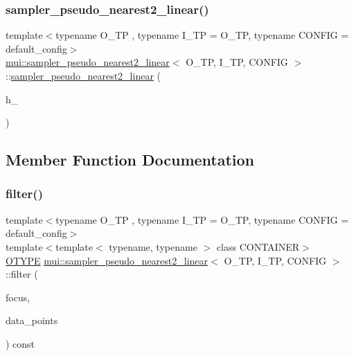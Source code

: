 \subsubsection{\texorpdfstring{sampler\+\_\+pseudo\+\_\+nearest2\+\_\+linear()}{sampler\_pseudo\_nearest2\_linear()}}
{\footnotesize\ttfamily template$<$typename O\+\_\+\+TP , typename I\+\_\+\+TP  = O\+\_\+\+TP, typename C\+O\+N\+F\+IG  = default\+\_\+config$>$ \\
\hyperlink{classmui_1_1sampler__pseudo__nearest2__linear}{mui\+::sampler\+\_\+pseudo\+\_\+nearest2\+\_\+linear}$<$ O\+\_\+\+TP, I\+\_\+\+TP, C\+O\+N\+F\+IG $>$\+::\hyperlink{classmui_1_1sampler__pseudo__nearest2__linear}{sampler\+\_\+pseudo\+\_\+nearest2\+\_\+linear} (\begin{DoxyParamCaption}\item[{\hyperlink{classmui_1_1sampler__pseudo__nearest2__linear_aa35e86c6cf0ff62396daf5a94b6d931e}{R\+E\+AL}}]{h\+\_\+ }\end{DoxyParamCaption})\hspace{0.3cm}{\ttfamily [inline]}}



\subsection{Member Function Documentation}
\mbox{\label{classmui_1_1sampler__pseudo__nearest2__linear_adfcf81c81b9f4720328cb3d0f1de5060}} 
\subsubsection{\texorpdfstring{filter()}{filter()}}
{\footnotesize\ttfamily template$<$typename O\+\_\+\+TP , typename I\+\_\+\+TP  = O\+\_\+\+TP, typename C\+O\+N\+F\+IG  = default\+\_\+config$>$ \\
template$<$template$<$ typename, typename $>$ class C\+O\+N\+T\+A\+I\+N\+ER$>$ \\
\hyperlink{classmui_1_1sampler__pseudo__nearest2__linear_a3c1ae43f20045121e8c84d1f7116cf67}{O\+T\+Y\+PE} \hyperlink{classmui_1_1sampler__pseudo__nearest2__linear}{mui\+::sampler\+\_\+pseudo\+\_\+nearest2\+\_\+linear}$<$ O\+\_\+\+TP, I\+\_\+\+TP, C\+O\+N\+F\+IG $>$\+::filter (\begin{DoxyParamCaption}\item[{\hyperlink{classmui_1_1sampler__pseudo__nearest2__linear_ab60b56e487c5be134d5efcbf03f7621f}{point\+\_\+type}}]{focus,  }\item[{const C\+O\+N\+T\+A\+I\+N\+ER$<$ \hyperlink{classmui_1_1sampler__pseudo__nearest2__linear_a1ab1a956844436db5763df87746f4090}{I\+T\+Y\+PE}, C\+O\+N\+F\+IG $>$ \&}]{data\+\_\+points }\end{DoxyParamCaption}) const\hspace{0.3cm}{\ttfamily [inline]}}

